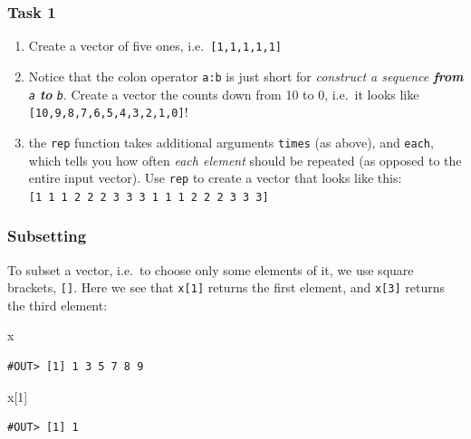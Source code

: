 \documentclass[]{book}
\newenvironment{Shaded}{\begin{snugshade}}{\end{snugshade}}
\newcommand{\DecValTok}[1]{\textcolor[rgb]{0.00,0.00,0.81}{#1}}
\newcommand{\NormalTok}[1]{#1}
\providecommand{\tightlist}{%
  \setlength{\itemsep}{0pt}\setlength{\parskip}{0pt}}
\begin{document}
\hypertarget{task-1}{%
\subsubsection{Task 1}\label{task-1}}

\begin{enumerate}
\def\labelenumi{\arabic{enumi}.}
\tightlist
\item
  Create a vector of five ones, i.e.~\texttt{{[}1,1,1,1,1{]}}
\item
  Notice that the colon operator \texttt{a:b} is just short for \emph{construct a sequence \textbf{from} \texttt{a} \textbf{to} \texttt{b}}. Create a vector the counts down from 10 to 0, i.e.~it looks like \texttt{{[}10,9,8,7,6,5,4,3,2,1,0{]}}!
\item
  the \texttt{rep} function takes additional arguments \texttt{times} (as above), and \texttt{each}, which tells you how often \emph{each element} should be repeated (as opposed to the entire input vector). Use \texttt{rep} to create a vector that looks like this: \texttt{{[}1\ 1\ 1\ 2\ 2\ 2\ 3\ 3\ 3\ 1\ 1\ 1\ 2\ 2\ 2\ 3\ 3\ 3{]}}
\end{enumerate}

\hypertarget{subsetting}{%
\subsubsection{Subsetting}\label{subsetting}}

To subset a vector, i.e.~to choose only some elements of it, we use square brackets, \texttt{{[}{]}}. Here we see that \texttt{x{[}1{]}} returns the first element, and \texttt{x{[}3{]}} returns the third element:

\begin{Shaded}
\begin{Highlighting}[]
\NormalTok{x}
\end{Highlighting}
\end{Shaded}

\begin{verbatim}
#OUT> [1] 1 3 5 7 8 9
\end{verbatim}

\begin{Shaded}
\begin{Highlighting}[]
\NormalTok{x[}\DecValTok{1}\NormalTok{]}
\end{Highlighting}
\end{Shaded}

\begin{verbatim}
#OUT> [1] 1
\end{verbatim}
\end{document}
